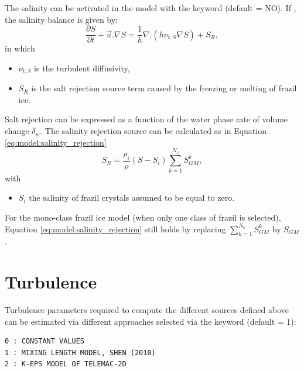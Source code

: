 The salinity can be activated in the model with the keyword  (default = NO).
If  , the salinity balance is given by:
\begin{equation}
\frac{\partial S}{\partial t} + \vec{u}. \nabla S = \dfrac{1}{h}  \nabla . \left( h \nu_{t,S} \nabla S \right)
+ S_{R} ,
\label{eq:model:salinity}
\end{equation}
in which
\begin{itemize}
	\item $\nu_{t,S}$ is the turbulent diffusivity,
	\item $S_{R}$ is the salt rejection source term caused by the freezing or melting of frazil ice.
\end{itemize}
Salt rejection can be expressed as a function of the water phase rate of volume change $\delta_w$.
The salinity rejection source can be calculated as in Equation \eqref{eq:model:salinity_rejection}
\begin{equation}
S_{R} = \frac{\rho_i}{\rho} (S-S_i) \sum_{k=1}^{N_c} S^k_{GM},
\label{eq:model:salinity_rejection}
\end{equation}
with
\begin{itemize}
	\item $S_i$ the salinity of frazil crystals assumed to be equal to zero.
\end{itemize}

For the mono-class frazil ice model (when only one class of frazil is selected),
Equation \eqref{eq:model:salinity_rejection} still
holds by replacing $\sum_{k=1}^{N_c} S^k_{GM}$ by $S_{GM}$.

\section{Turbulence}
\label{turbulence}

Turbulence parameters required to compute the different sources defined above
can be estimated via different approaches selected via the keyword
 (default = 1):
\begin{lstlisting}
0 : CONSTANT VALUES
1 : MIXING LENGTH MODEL, SHEN (2010)
2 : K-EPS MODEL OF TELEMAC-2D
\end{lstlisting}

